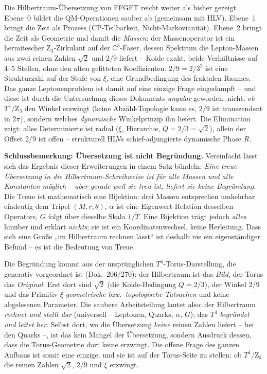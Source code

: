 \begin{conclusionBox}[Fazit]
Die Hilbertraum-Übersetzung von FFGFT reicht weiter als bisher gezeigt. Ebene~0
bildet die QM-Operationen sauber ab (gemeinsam mit HLV). Ebene~1 bringt die
Zeit als Prozess (CP-Teilbarkeit, Nicht-Markovianität). Ebene~2 bringt die
Zeit als Geometrie und damit die \emph{Massen}: der Massenoperator ist ein
hermitescher Z$_3$-Zirkulant auf der $\mathbb{C}^3$-Faser, dessen Spektrum die
Lepton-Massen aus zwei reinen Zahlen $\sqrt2$ und $2/9$ liefert -- Koide exakt,
beide Verhältnisse auf 4--5 Stellen, ohne den alten gefitteten Koeffizienten.
$2/9=2/3^2$ ist eine Strukturzahl auf der Stufe von $\xi$, eine Grundbedingung
des fraktalen Raumes. Das ganze Leptonenproblem ist damit auf eine einzige Frage
eingedampft -- und diese ist durch die Untersuchung dieses Dokuments
\emph{angular} geworden: nicht, \emph{ob} $T^4$/Z$_3$ den Winkel erzwingt (keine
Abzähl-Topologie kann es, $2/9$ ist transzendent in $2\pi$), sondern welches
\emph{dynamische} Winkelprinzip ihn liefert. Die Elimination zeigt: alles
Determinierte ist radial ($\xi$, Hierarchie, $Q=2/3=\sqrt2$), allein der Offset
$2/9$ ist offen -- strukturell HLVs schief-adjungierte dynamische Phase $R$.
\end{conclusionBox}

\bigskip
\noindent\textbf{Schlussbemerkung: Übersetzung ist nicht Begründung.}
Vereinfacht lässt sich das Ergebnis dieser Erweiterungen in einem Satz bündeln:
\emph{Eine treue Übersetzung in die Hilbertraum-Schreibweise ist für alle Massen
und alle Konstanten möglich -- aber gerade weil sie treu ist, liefert sie keine
Begründung.} Die Treue ist mathematisch eine Bijektion: drei Massen entsprechen
umkehrbar eindeutig dem Tripel $(M,r,\theta)$, $\alpha$ ist eine
Eigenwert-Relation desselben Operators, $G$ folgt über dieselbe Skala
$1/\tilde T$. Eine Bijektion trägt jedoch \emph{alles} hinüber und erklärt
\emph{nichts}; sie ist ein Koordinatenwechsel, keine Herleitung. Dass sich eine
Größe „im Hilbertraum rechnen lässt`` ist deshalb nie ein eigenständiger Befund
-- es ist die Bedeutung von Treue.

\smallskip
\noindent
Die Begründung kommt aus der ursprünglichen $T^4$-Torus-Darstellung, die
generativ vorgeordnet ist (Dok.~206/270): der Hilbertraum ist das \emph{Bild},
der Torus das \emph{Original}. Erst dort sind $\sqrt2$ (die Koide-Bedingung
$Q=2/3$), der Winkel $2/9$ und das Primitiv $\xi$ \emph{geometrische bzw.\
topologische Tatsachen} und keine abgelesenen Parameter. Die saubere
Arbeitsteilung lautet also: der Hilbertraum \emph{rechnet und stellt dar}
(universell -- Leptonen, Quarks, $\alpha$, $G$); das $T^4$ \emph{begründet und
leitet her}. Selbst dort, wo die Übersetzung \emph{keine} reinen Zahlen liefert
-- bei den Quarks --, ist das kein Mangel der Übersetzung, sondern Ausdruck
dessen, dass die Torus-Geometrie dort keine erzwingt. Die offene Frage des ganzen
Aufbaus ist somit eine einzige, und sie ist auf der Torus-Seite zu stellen: ob
$T^4$/Z$_3$ die reinen Zahlen $\sqrt2$, $2/9$ und $\xi$ erzwingt.

